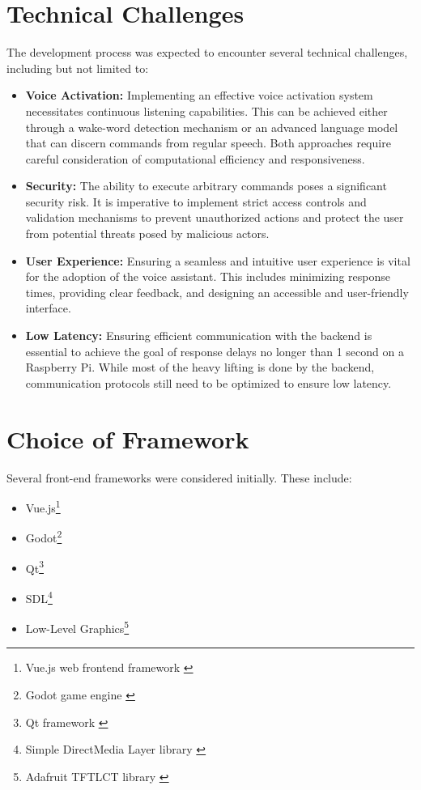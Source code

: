 \section{Technical Challenges}
The development process was expected to encounter several technical challenges, including but not limited to:
\begin{itemize}
    \item \textbf{Voice Activation:} Implementing an effective voice activation system necessitates continuous listening capabilities. This can be achieved either through a wake-word detection mechanism or an advanced language model that can discern commands from regular speech. Both approaches require careful consideration of computational efficiency and responsiveness.
    \item \textbf{Security:} The ability to execute arbitrary commands poses a significant security risk. It is imperative to implement strict access controls and validation mechanisms to prevent unauthorized actions and protect the user from potential threats posed by malicious actors.
    \item \textbf{User Experience:} Ensuring a seamless and intuitive user experience is vital for the adoption of the voice assistant. This includes minimizing response times, providing clear feedback, and designing an accessible and user-friendly interface.
    \item \textbf{Low Latency:} Ensuring efficient communication with the backend is essential to achieve the goal of response delays no longer than 1 second on a Raspberry Pi. While most of the heavy lifting is done by the backend, communication protocols still need to be optimized to ensure low latency.
\end{itemize}

\section{Choice of Framework}
Several front-end frameworks were considered initially. These include:
\begin{itemize}
\item Vue.js\footnote{Vue.js web frontend framework \cite{vuejs}}
\item Godot\footnote{Godot game engine \cite{godot}}
\item Qt\footnote{Qt framework \cite{qt}}
\item SDL\footnote{Simple DirectMedia Layer library \cite{sdl}}
\item Low-Level Graphics\footnote{Adafruit TFTLCT library \cite{adafruit-tftlcd}}
\end{itemize}

